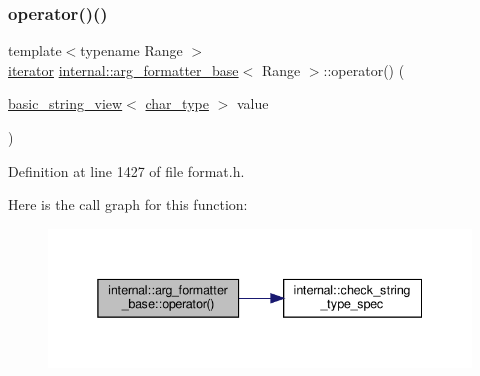 \subsubsection{\texorpdfstring{operator()()}{operator()()}\hspace{0.1cm}{\footnotesize\ttfamily [5/6]}}
{\footnotesize\ttfamily template$<$typename Range $>$ \\
\hyperlink{classinternal_1_1arg__formatter__base_a87622fdc9716fee6a6de2ae496e3a54f}{iterator} \hyperlink{classinternal_1_1arg__formatter__base}{internal\+::arg\+\_\+formatter\+\_\+base}$<$ Range $>$\+::operator() (\begin{DoxyParamCaption}\item[{\hyperlink{classbasic__string__view}{basic\+\_\+string\+\_\+view}$<$ \hyperlink{classinternal_1_1arg__formatter__base_a407930bf282880d2ca45dfa8f5d2034b}{char\+\_\+type} $>$}]{value }\end{DoxyParamCaption})\hspace{0.3cm}{\ttfamily [inline]}}



Definition at line 1427 of file format.\+h.

Here is the call graph for this function\+:
\nopagebreak
\begin{figure}[H]
\begin{center}
\leavevmode
\includegraphics[width=338pt]{classinternal_1_1arg__formatter__base_a3883b00024fb661ac96cd0e182002ff2_cgraph}
\end{center}
\end{figure}
\mbox{\label{classinternal_1_1arg__formatter__base_a77a4267b70ae9bd069e6134a7b2af862}} 
